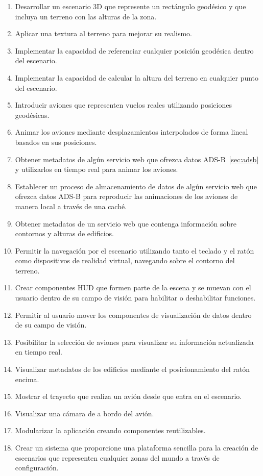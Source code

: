\documentclass[a4paper, 11pt]{book}
\begin{document}
\begin{enumerate}
    \item Desarrollar un escenario 3D que represente un rectángulo geodésico y que incluya un terreno con las alturas de la zona.
    \item Aplicar una textura al terreno para mejorar su realismo.
    \item Implementar la capacidad de referenciar cualquier posición geodésica dentro del escenario.
    \item Implementar la capacidad de calcular la altura del terreno en cualquier punto del escenario.
    \item Introducir aviones que representen vuelos reales utilizando posiciones geodésicas.
    \item Animar los aviones mediante desplazamientos interpolados de forma lineal basados en sus posiciones.
    \item Obtener metadatos de algún servicio web que ofrezca datos \textsc{ADS-B}~\ref{sec:adsb} y utilizarlos en tiempo real para animar los aviones.
    \item Establecer un proceso de almacenamiento de datos de algún servicio web que ofrezca datos \textsc{ADS-B} para reproducir las animaciones de los aviones de manera local a través de una caché.
    \item Obtener metadatos de un servicio web que contenga información sobre contornos y alturas de edificios.
    \item Permitir la navegación por el escenario utilizando tanto el teclado y el ratón como dispositivos de realidad virtual, navegando sobre el contorno del terreno.
    \item Crear componentes \textsc{\gls{HUD}} que formen parte de la escena y se muevan con el usuario dentro de su campo de visión para habilitar o deshabilitar funciones.
    \item Permitir al usuario mover los componentes de visualización de datos dentro de su campo de visión.
    \item Posibilitar la selección de aviones para visualizar su información actualizada en tiempo real.
    \item Visualizar metadatos de los edificios mediante el posicionamiento del ratón encima.
    \item Mostrar el trayecto que realiza un avión desde que entra en el escenario.
    \item Visualizar una cámara de a bordo del avión.
    \item Modularizar la aplicación creando componentes reutilizables.
    \item Crear un sistema que proporcione una plataforma sencilla para la creación de escenarios que representen cualquier zonas del mundo a través de configuración.
\end{enumerate}
\end{document}
